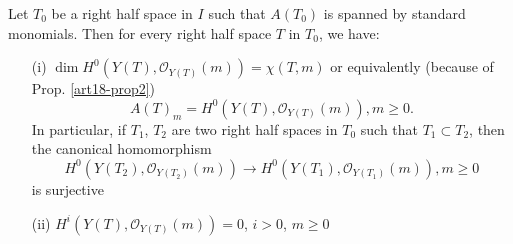 \begin{prop}\label{art18-prop3}
Let $T_0$ be a right half space in $I$ such that $A(T_0)$ is spanned by standard monomials. Then for every right half space $T$ in $T_0$, we have:
\begin{itemize}
\item[\rm (i)] $\dim H^0(Y (T), \mathscr{O}_{Y(T)} (m)) =\chi (T, m)$ or equivalently (because of Prop. \ref{art18-prop2})
$$
A(T)_m = H^0 (Y(T), \mathscr{O}_{Y(T)} (m)), m \geqslant 0.
$$
In particular, if $T_1$, $T_2$ are two right half spaces in $T_0$ such that $T_1 \subset T_2$, then the canonical homomorphism
$$
H^0 (Y(T_2), \mathscr{O}_{Y(T_2)} (m)) \to H^0 (Y(T_1), \mathscr{O}_{Y(T_1)}(m)), m \geqslant 0
$$
is surjective

\item[\rm (ii)] $H^i (Y (T), \mathscr{O}_{Y(T)}(m)) = 0$, $i > 0$, $m \geqslant 0$
\end{itemize}
 \end{prop}

